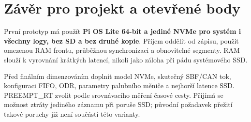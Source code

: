 \documentclass[11pt,a4paper]{article}
\begin{document}
\section{Závěr pro projekt a otevřené body}
První prototyp má použít \textbf{Pi OS Lite 64-bit a jediné NVMe pro systém i všechny logy, bez SD a bez druhé kopie}. Příjem oddělit od zápisu, použít omezenou RAM frontu, průběžnou synchronizaci a obnovitelné segmenty. RAM slouží k vyrovnání krátkých latencí, nikoli jako záloha při pádu systémového SSD.

Před finálním dimenzováním doplnit model NVMe, skutečný SBF/CAN tok, konfiguraci FIFO, ODR, parametry palubního měniče a nejhorší latence SSD. PREEMPT\_RT zvolit podle srovnávacího měření časové cesty. Přijímá se možnost ztráty jediného záznamu při poruše SSD; původní požadavek přežití takové poruchy již není součástí této varianty.
\end{document}
